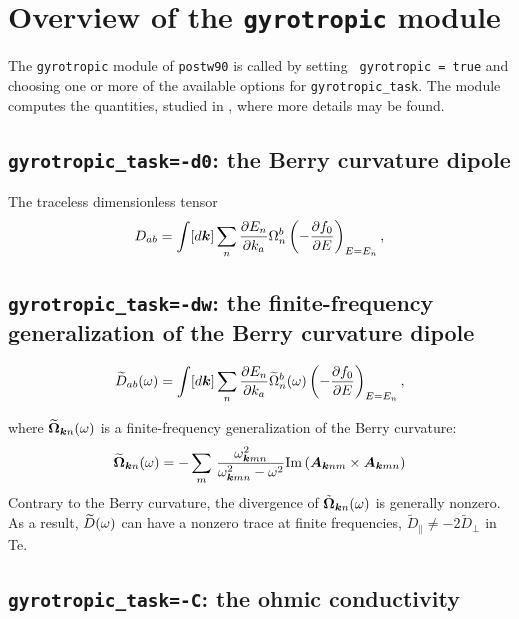 \chapter{Overview of the {\tt gyrotropic} module \label{ch:gyrotropic}}


The {\tt gyrotropic} module of {\tt postw90} is called by setting {\tt
  gyrotropic = true} and choosing one or more of the available options for
{\tt gyrotropic\_task}. The module computes the quantities, studied in 
 \cite{tsirkin-arxiv17}, where more details may be found.

\section{{\tt gyrotropic\_task=-d0}: the Berry curvature dipole  }

The traceless dimensionless tensor
\begin{equation}
\label{eq:D_ab}
D_{ab}=\int[d{\bm k}]\sum_n
\frac{\partial E_n}{\partial{k_a}}
\Omega_n^b
\left(-\frac{\partial f_0}{\partial E}\right)_{E=E_n},
\end{equation}


\section{{\tt gyrotropic\_task=-dw}: the finite-frequency generalization of the Berry curvature dipole  }

\begin{equation}
\label{eq:D-tilde}
\widetilde{D}_{ab}(\omega)=\int[d{\bm k}]\sum_n
\frac{\partial E_n}{\partial{k_a}}\widetilde\Omega^b_n(\omega)
\left(-\frac{\partial f_0}{\partial E}\right)_{E=E_n},
\end{equation}

where $\widetilde{\bm\Omega}_{{\bm k} n}(\omega)$ is a finite-frequency
generalization of the Berry curvature:
%
%
\begin{equation}
\label{eq:curv-w}
\widetilde{\bm\Omega}_{{\bm k} n}(\omega)=-
\sum_m\,\frac{\omega^2_{{\bm k} mn}}{\omega^2_{{\bm k} mn}-\omega^2}
{\rm Im}\left({\bm A}_{{\bm k} nm}\times{\bm A}_{{\bm k} mn}\right)
\end{equation}
Contrary to the Berry
  curvature, the divergence of $\tilde{\bm\Omega}_{{\bm k} n}(\omega)$ is
  generally nonzero. As a result, $\widetilde{D}(\omega)$ 
can have a nonzero trace at finite frequencies, $\tilde{D}_\|\neq-2\tilde{D}_\perp$ in Te.

\section{{\tt gyrotropic\_task=-C}: the ohmic  conductivity }

